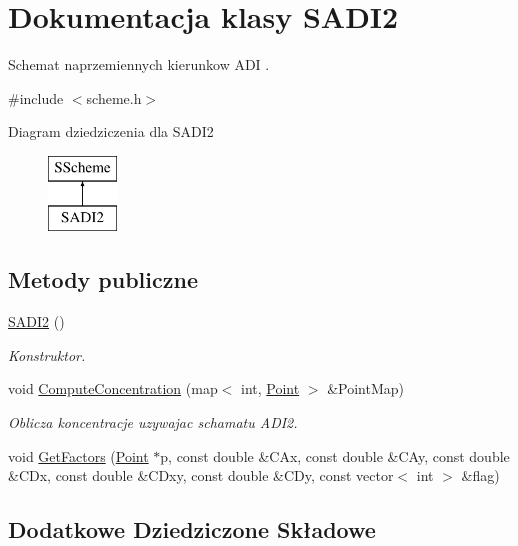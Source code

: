 \hypertarget{class_s_a_d_i2}{}\section{Dokumentacja klasy S\+A\+D\+I2}
\label{class_s_a_d_i2}


Schemat naprzemiennych kierunkow A\+D\+I .  




{\ttfamily \#include $<$scheme.\+h$>$}

Diagram dziedziczenia dla S\+A\+D\+I2\begin{figure}[H]
\begin{center}
\leavevmode
\includegraphics[height=2.000000cm]{class_s_a_d_i2}
\end{center}
\end{figure}
\subsection*{Metody publiczne}
\begin{DoxyCompactItemize}
\item 
\hyperlink{class_s_a_d_i2_ac5d404d44833aaf803fee9ae9a8d5d19}{S\+A\+D\+I2} ()
\begin{DoxyCompactList}\small\item\em Konstruktor. \end{DoxyCompactList}\item 
void \hyperlink{class_s_a_d_i2_a41903e3b443ba68fe68cbad73fe44970}{Compute\+Concentration} (map$<$ int, \hyperlink{class_point}{Point} $>$ \&Point\+Map)
\begin{DoxyCompactList}\small\item\em Oblicza koncentracje uzywajac schamatu A\+D\+I2. \end{DoxyCompactList}\item 
void \hyperlink{class_s_a_d_i2_afac90c203840a07b31f73418af815063}{Get\+Factors} (\hyperlink{class_point}{Point} $\ast$p, const double \&C\+Ax, const double \&C\+Ay, const double \&C\+Dx, const double \&C\+Dxy, const double \&C\+Dy, const vector$<$ int $>$ \&flag)
\end{DoxyCompactItemize}
\subsection*{Dodatkowe Dziedziczone Składowe}


